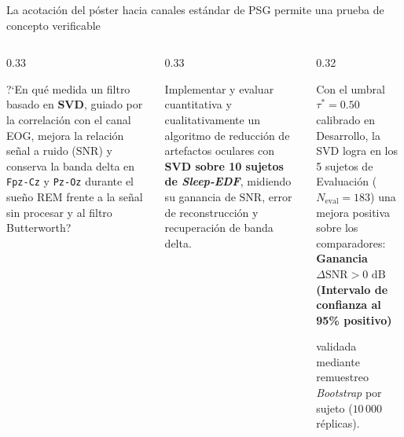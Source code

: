 \documentclass[aspectratio=169,9pt]{beamer}
\begin{document}
\begin{frame}{La acotaci\'on del p\'oster hacia canales est\'andar de PSG permite una prueba de concepto verificable}
  \vspace{0.08cm}

  \begin{columns}[T,onlytextwidth]
    \begin{column}{0.33\textwidth}
      \begin{tcolorbox}[navycard, title={\scriptsize\bfseries Pregunta de Investigaci\'on}, colbacktitle=UDNavy, coltitle=white, equal height group=poh]
        \scriptsize
        ?`En qu\'e medida un filtro basado en \textbf{SVD}, guiado por la correlaci\'on con el canal EOG, mejora la relaci\'on se\~nal a ruido ($\text{SNR}$) y conserva la banda delta en \texttt{Fpz-Cz} y \texttt{Pz-Oz} durante el sue\~no REM frente a la se\~nal sin procesar y al filtro Butterworth?
      \end{tcolorbox}
    \end{column}
    \begin{column}{0.33\textwidth}
      \begin{tcolorbox}[tealcard, title={\scriptsize\bfseries Objetivo General}, colbacktitle=UDTeal!85!black, coltitle=white, equal height group=poh]
        \scriptsize
        Implementar y evaluar cuantitativa y cualitativamente un algoritmo de reducci\'on de artefactos oculares con \textbf{SVD sobre 10 sujetos de \textit{Sleep-EDF}}, midiendo su ganancia de $\text{SNR}$, error de reconstrucci\'on y recuperaci\'on de banda delta.
      \end{tcolorbox}
    \end{column}
    \begin{column}{0.32\textwidth}
      \begin{tcolorbox}[ambercard, title={\scriptsize\bfseries Hip\'otesis Verificable}, colbacktitle=UDAmber!85!black, coltitle=white, equal height group=poh]
        \scriptsize
        Con el umbral $\tau^*=0.50$ calibrado en Desarrollo, la SVD logra en los 5 sujetos de Evaluaci\'on ($N_{\text{eval}}=183$) una mejora positiva sobre los comparadores:\\[0.08cm]
        \centering\textbf{Ganancia $\Delta\text{SNR} > 0\text{ dB}$}\\
        {\tiny\textbf{(Intervalo de confianza al 95\% positivo)}}\\[0.04cm]
        \raggedright validada mediante remuestreo \textit{Bootstrap} por sujeto ($10\,000$ r\'eplicas).
      \end{tcolorbox}
    \end{column}
  \end{columns}
\end{frame}
\end{document}
